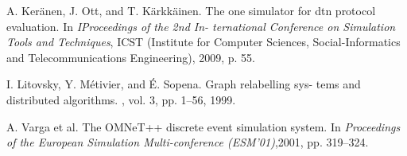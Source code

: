 \begin{thebibliography}{1}
	A. Keränen, J. Ott, and T. Kärkkäinen.
	\newblock The one simulator for dtn protocol evaluation.
	\newblock In {\em IProceedings of the 2nd In- ternational Conference on Simulation Tools and Techniques}, ICST (Institute for Computer Sciences, Social-Informatics and Telecommunications Engineering), 2009, p. 55.

	I. Litovsky, Y. Métivier, and É. Sopena.
	\newblock Graph relabelling sys- tems and distributed algorithms.
	, vol. 3, pp. 1–56, 1999.

	A. Varga et al.
	\newblock The OMNeT++ discrete event simulation system.
	\newblock In {\em  Proceedings of the European Simulation Multi-conference (ESM’01)},2001, pp. 319–324.
	
	
\end{thebibliography}